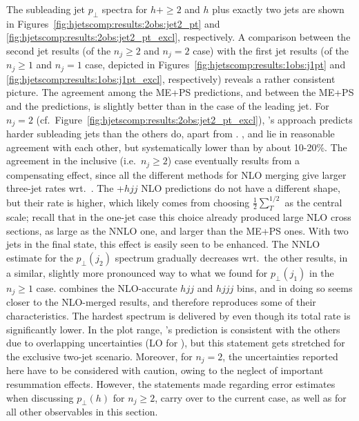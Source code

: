 The subleading jet $p_\perp$ spectra for $h+\ge2$ and $h$ plus exactly
two jets are shown in Figures~\ref{fig:hjetscomp:results:2obs:jet2_pt}
and \ref{fig:hjetscomp:results:2obs:jet2_pt_excl}, respectively. A
comparison between the second jet results (of the
$n_j\ge2$ and $n_j=2$ case) with the first jet results (of the
$n_j\ge1$ and $n_j=1$ case, depicted in
Figures~\ref{fig:hjetscomp:results:1obs:j1pt} and
\ref{fig:hjetscomp:results:1obs:j1pt_excl}, respectively) reveals a
rather consistent picture. The agreement among the ME+PS
predictions, and between the ME+PS and the \hjetscompPowheg predictions, is
slightly better than in the case of the leading jet. For $n_j=2$
(cf.~Figure~\ref{fig:hjetscomp:results:2obs:jet2_pt_excl}), \hjetscompPowheg's
\hjetscompNNLOPS approach predicts harder subleading jets than the others do,
apart from \hjetscompHej. \hjetscompMGaMC, \hjetscompSherpa and \hjetscompHerwig lie in reasonable
agreement with each other, but systematically lower than \hjetscompPowheg by
about 10-20\%. The agreement in the inclusive (i.e.~$n_j\ge2$) case
eventually results from a compensating effect, since all the different
methods for NLO merging give larger three-jet rates wrt.~\hjetscompPowheg. The
\hjetscompGoSam{}+\hjetscompSherpa $hjj$ NLO predictions do not have a different shape,
but their rate is higher, which likely comes from choosing
$\tfrac{1}{2}\sum_T^{1/2}$ as the central scale; recall that in the
one-jet case this choice already produced large NLO cross sections, as
large as the NNLO one, and larger than the ME+PS ones. With two jets
in the final state, this effect is easily seen to be enhanced. The
\hjetscompLoopsim NNLO estimate for the $p_\perp(j_2)$ spectrum gradually
decreases wrt.~the other \hjetscompGoSam results, in a similar, slightly more
pronounced way to what we found for $p_\perp(j_1)$ in the $n_j\ge1$
case. 
\hjetscompLoopsim combines the NLO-accurate $hjj$ and $hjjj$ bins, and in doing
so  seems closer to the NLO-merged results, and therefore reproduces
some of their characteristics. The hardest spectrum is
delivered by \hjetscompHej even though its total rate is significantly lower. 
In the plot range, \hjetscompHej's prediction is consistent with the others due 
to overlapping uncertainties (LO for \hjetscompHej), but this statement gets
stretched for the exclusive two-jet scenario. Moreover, for $n_j=2$,
the   uncertainties reported here have to be considered with caution,
owing to the neglect of important resummation effects. However, the
statements made regarding error estimates when discussing 
$p_\perp(h)$ for $n_j\ge2$, carry over to the current case, as well as
for all other observables in this section.

